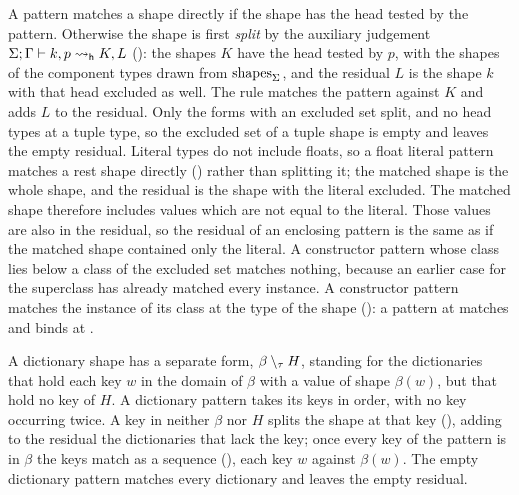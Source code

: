 

A pattern matches a shape directly if the shape has the head tested by the pattern. Otherwise the shape
is first \emph{split} by the auxiliary judgement $\Sigma; \Gamma \vdash k, p \mathrel{\rightsquigarrow_{\mathsf{h}}} K, L$ ():
the shapes $K$ have the head tested by $p$, with the shapes of the component types drawn from $\mathrm{shapes}_{\Sigma}$,
and the residual $L$ is the shape $k$ with that head excluded as well. The  rule matches
the pattern against $K$ and adds $L$ to the residual. Only the forms
with an excluded set split, and no head types at a tuple type, so the excluded set of a tuple shape is
empty and  leaves the empty residual. Literal types do not include floats, so a float
literal pattern matches a rest shape directly () rather than splitting it; the matched shape
is the whole shape, and the residual is the shape with the literal excluded. The matched shape therefore includes values
which are not equal to the literal. Those values are also in the residual, so the residual of an enclosing pattern is the
same as if the matched shape contained only the literal.
A constructor pattern whose class lies below a
class of the excluded set matches nothing, because an earlier case for the superclass has already
matched every instance. A constructor pattern matches the instance of its class at the type of the shape (): a pattern  at  matches  and binds  at .

A dictionary shape has a separate form,
$\beta \setminus_{\tau} H$, standing for the dictionaries that hold each key $w$ in the domain of
$\beta$ with a value of shape $\beta(w)$, but that hold no key of $H$. A dictionary pattern takes its keys in order, with no key occurring twice. A key in
neither $\beta$ nor $H$ splits the shape at that key (), adding to the residual the
dictionaries that lack the key; once every key of the pattern is in $\beta$ the keys match as a sequence
(), each key $w$ against $\beta(w)$. The empty dictionary pattern matches every
dictionary and leaves the empty residual.

